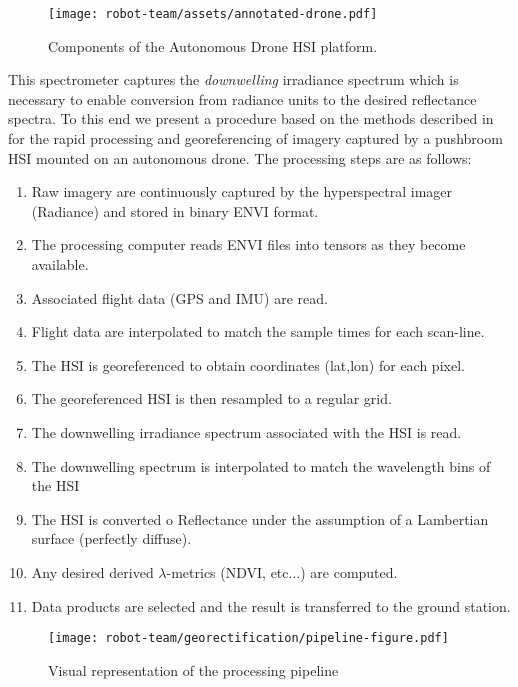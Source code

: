 \begin{figure}[!hbt]
  \centering
  \texttt{[image: robot-team/assets/annotated-drone.pdf]}
  \caption{Components of the Autonomous Drone HSI platform.}
  \label{fig:drone-components}
\end{figure}
This spectrometer captures the \textit{downwelling} irradiance spectrum which is necessary to enable conversion from radiance units to the desired reflectance spectra. To this end we present a procedure based on the methods described in \cite{muller-georeferencing, GeorectificationBaumker, GeorectificationMostafa} for the rapid processing and georeferencing of imagery captured by a pushbroom HSI mounted on an autonomous drone. The processing steps are as follows:
\begin{enumerate}
\item Raw imagery are continuously captured by the hyperspectral imager (Radiance) and stored in binary ENVI format.
\item The processing computer reads ENVI files into tensors as they become available.
\item Associated flight data (GPS and IMU) are read.
\item Flight data are interpolated to match the sample times for each scan-line.
\item The HSI is georeferenced to obtain coordinates (lat,lon) for each pixel.
\item The georeferenced HSI is then resampled to a regular grid.
\item The downwelling irradiance spectrum associated with the HSI is read.
\item The downwelling spectrum is interpolated to match the wavelength bins of the HSI
\item The HSI is converted o Reflectance under the assumption of a Lambertian surface (perfectly diffuse).
\item Any desired derived $\lambda$-metrics (NDVI, etc...) are computed.
\item Data products are selected and the result is transferred to the ground station.
\end{enumerate}

\begin{figure}[h]
  \centering
  \texttt{[image: robot-team/georectification/pipeline-figure.pdf]}
  \caption{Visual representation of the processing pipeline}
  \label{fig:annotated-hsi}
\end{figure}


